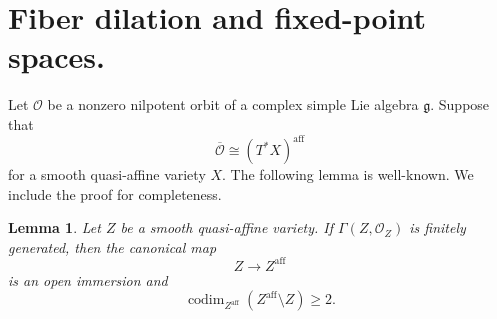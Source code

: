\documentclass[12pt]{article}
\newtheorem{lemma}[theorem]{Lemma}
\theoremstyle{remark}
\theoremstyle{plain}
\newcommand{\aff}{\mathrm{aff}}
\begin{document}
\section{Fiber dilation and fixed-point spaces.}\label{sec:fiber}

Let $\mathcal O$ be a nonzero nilpotent orbit of a complex simple Lie
algebra $\mathfrak g$. Suppose that
\[
\overline{\mathcal O}\cong(T^*X)^{\aff}
\]
for a smooth quasi-affine variety $X$.
The following lemma is well-known. We include the proof for
completeness.

\begin{lemma}\label{lem:small-boundary}
Let $Z$ be a smooth quasi-affine variety. If
$\Gamma(Z,\mathcal O_Z)$ is finitely generated, then the canonical map
\[
Z\longrightarrow Z^{\aff}
\]
is an open immersion and
\[
\operatorname{codim}_{Z^{\aff}}(Z^{\aff}\setminus Z)\geq2.
\]
\end{lemma}
\end{document}
